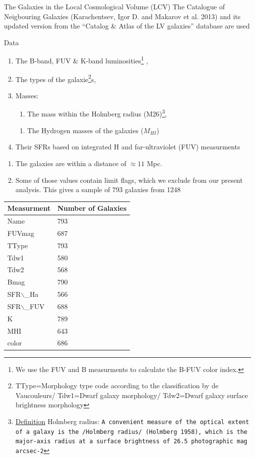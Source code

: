 \documentclass[presentation]{beamer}
\begin{document}
\begin{frame}[label={sec:org75f05ef}]{The Galaxies in the Local Cosmological Volume (LCV)}
The Catalogue of Neigbouring Galaxies (Karachentsev, Igor D. and Makarov  et al. 2013\autocite{karachentsevUPDATEDNEARBYGALAXY2013}) and its updated version from the ``Catalog \& Atlas of the LV galaxies'' database\autocite{CatalogLVGalaxies}  are used

\begin{block}{Data}
\begin{enumerate}
\item The B-band, FUV \& K-band luminosities\footnote{We use the FUV and B measurments to calculate the B-FUV color index.} ,
\item The types of the galaxie\footnote{TType=Morphology type code according to the classification by de Vaucouleurs/ Tdw1=Dwarf galaxy morphology/ Tdw2=Dwarf galaxy surface brightness morphology}s,
\item Masses:
\begin{enumerate}
\item The mass within the Holmberg radius (M26)\footnote{\uline{Definition} \alert{Holmberg radius}: \texttt{A convenient measure of the optical extent of a galaxy is the /Holmberg radius/ (Holmberg 1958), which is the major-axis radius at a surface brightness of 26.5 photographic mag arcsec-2}\autocite{MassesMasstoLightRatios}},
\end{enumerate}
\begin{enumerate}
\item The Hydrogen masses of the galaxies (\(M_{HI}\))
\end{enumerate}
\item Their SFRs based on integrated  H and far-ultraviolet (FUV) measurments
\end{enumerate}

\begin{enumerate}
\item The galaxies are within a distance of \(\approx 11\) Mpc.
\item Some of those values contain limit flags, which we exclude from our present analysis. This gives a sample of 793 galaxies from 1248
\end{enumerate}

\begin{center}
\begin{tabular}{|l|l|}
\hline
Measurment & Number of Galaxies \\
\hline
Name & 793 \\
FUVmag & 687 \\
TType & 793 \\
Tdw1 & 580 \\
Tdw2 & 568 \\
Bmag & 790 \\
SFR$\backslash$\_Ha & 566 \\
SFR$\backslash$\_FUV & 688 \\
K & 789 \\
MHI & 643 \\
color & 686 \\
\hline
\end{tabular}
\end{center}


\end{block}
\end{frame}
\end{document}
